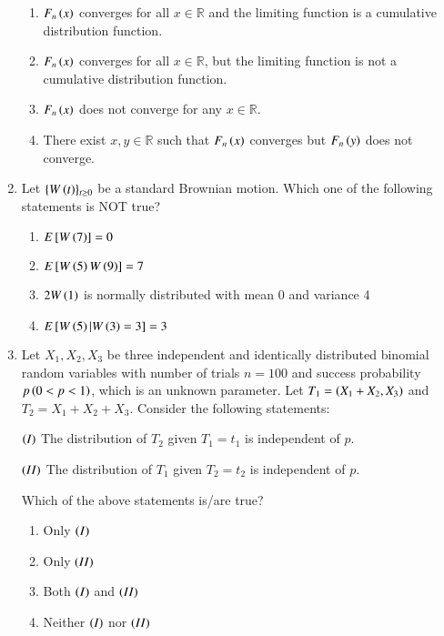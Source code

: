 \documentclass[journal]{IEEEtran}
\numberwithin{equation}{enumi}
\numberwithin{figure}{enumi}
\begin{document}
\begin{enumerate}
\begin{enumerate}
    \item $F_n\left(x\right)$ converges for all $x \in \mathbb{R}$ and the limiting function is a cumulative distribution function.
    \item $F_n\left(x\right)$ converges for all $x \in \mathbb{R}$, but the limiting function is not a cumulative distribution function.
    \item $F_n\left(x\right)$ does not converge for any $x \in \mathbb{R}$.
    \item There exist $x, y \in \mathbb{R}$ such that $F_n\left(x\right)$ converges but $F_n\left(y\right)$ does not converge.
\end{enumerate}

\item Let $\{W\left(t\right)\}_{t\geq 0}$ be a standard Brownian motion. Which one of the following statements is NOT true?

\begin{enumerate}
    \item $E{}\left[W\left(7\right)\right] = 0$
    \item $E{}\left[W\left(5\right)W\left(9\right)\right] = 7$
    \item $2W\left(1\right)$ is normally distributed with mean 0 and variance 4
    \item $E{}\left[W\left(5\right) | W\left(3\right) = 3\right] = 3$
\end{enumerate}

\item Let $X_1, X_2, X_3$ be three independent and identically distributed binomial random variables with number of trials $n = 100$ and success probability $p \left(0 < p < 1\right)$, which is an unknown parameter. Let $T_1 = \left(X_1 + X_2, X_3\right)$ and $T_2 = X_1 + X_2 + X_3$. Consider the following statements:

$\left(I\right)$ The distribution of $T_2$ given $T_1 = t_1$ is independent of $p$.

$\left(II\right)$ The distribution of $T_1$ given $T_2 = t_2$ is independent of $p$.

Which of the above statements is/are true?

\begin{enumerate}
    \item Only $\left(I\right)$
    \item Only $\left(II\right)$
    \item Both $\left(I\right)$ and $\left(II\right)$
    \item Neither $\left(I\right)$ nor $\left(II\right)$
\end{enumerate}


\end{enumerate}
\end{document}
